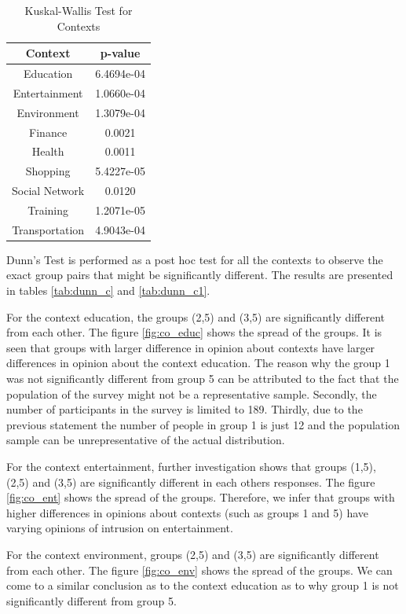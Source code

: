 \begin{table}[h!]
  \centering
  \caption{Kuskal-Wallis Test for Contexts}
  \label{tab:kw_c}
  \begin{tabular}{cc}
    \toprule
     Context & p-value \\
    \midrule
    Education &  6.4694e-04 \\
    Entertainment & 1.0660e-04\\
    Environment & 1.3079e-04\\
    Finance & 0.0021\\ 
    Health & 0.0011\\
    Shopping & 5.4227e-05\\ 
    Social Network &  0.0120\\
    Training & 1.2071e-05\\
    Transportation & 4.9043e-04\\ 
    \bottomrule
  \end{tabular}
\end{table} 

Dunn's Test is performed as a post hoc test for all the contexts to observe the exact group pairs that might be significantly different. The results are presented in tables \ref{tab:dunn_c} and \ref{tab:dunn_c1}. 

For the context education, the groups (2,5) and (3,5) are significantly different from each other. The figure \ref{fig:co_educ} shows the spread of the groups. It is seen that groups with larger difference in opinion about contexts have larger differences in opinion about the context education. The reason why the group 1 was not significantly different from group 5 can be attributed to the fact that the population of the survey might not be a representative sample. Secondly, the number of participants in the survey is limited to 189. Thirdly, due to the previous statement the number of people in group 1 is just 12 and the population sample can be unrepresentative of the actual distribution.

For the context entertainment, further investigation shows that groups (1,5), (2,5) and (3,5) are significantly different in each others responses. The figure \ref{fig:co_ent} shows the spread of the groups. Therefore, we infer that groups with higher differences in opinions about contexts (such as groups 1 and 5) have varying opinions of intrusion on entertainment.

For the context environment, groups (2,5) and (3,5) are significantly different from each other. The figure \ref{fig:co_env} shows the spread of the groups. We can come to a similar conclusion as to the context education as to why group 1 is not significantly different from group 5.

